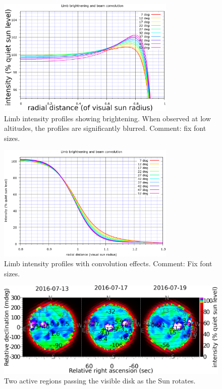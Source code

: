 \documentclass{aa}
\begin{document}
\begin{figure}
\centering
\includegraphics[width=8.5cm]{limbmodel_profiles1.png}
\caption{Limb intensity profiles showing brightening. When observed at low altitudes, the profiles are significantly blurred. Comment: fix font sizes.}
\label{limb_brightening1}
\end{figure}

\begin{figure}
\centering
\includegraphics[width=8.5cm]{limbmodel_profiles2.png}
\caption{Limb intensity profiles with convolution effects. Comment: Fix font sizes.}
\label{limb_brightening2}
\end{figure}

\begin{figure}
\centering
\includegraphics[width=\textwidth]{maptrack1.png}
\caption{Two active regions passing the visible disk as the Sun rotates.}
\label{maptrack1}
\end{figure}
\end{document}

